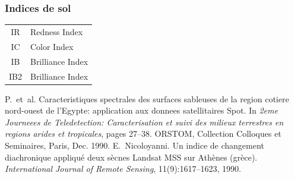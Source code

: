 \documentclass[compress]{beamer}
\begin{document}
\begin{frame}
\frametitle{Indices de sol}
\footnotesize \centering
\begin{tabular}{|c|l|}
\hline
IR  & Redness Index  \cite{Pouget1990-IRIC} \\
IC  & Color Index  \cite{Pouget1990-IRIC} \\
IB  & Brilliance Index  \cite{Nicoloyanni1990-IB} \\
IB2 & Brilliance Index  \cite{Nicoloyanni1990-IB} \\
\hline
\end{tabular}
\begin{thebibliography}{noidea}
\tiny
{}
P.~et~al.
 Caracteristiques spectrales des surfaces sableuses de la region
  cotiere nord-ouest de l'{E}gypte: application aux donnees satellitaires
  {S}pot.
 In {\em 2eme Journeees de Teledetection: Caracterisation et suivi des
  milieux terrestres en regions arides et tropicales}, pages 27--38. ORSTOM,
  Collection Colloques et Seminaires, Paris, Dec. 1990.
E.~Nicoloyanni.
 Un indice de changement diachronique appliqu\'e deux s\`ecnes
  {L}andsat {MSS} sur {A}th\`enes (gr\`ece).
 {\em International Journal of Remote Sensing}, 11(9):1617--1623,
  1990.
\end{thebibliography}
\end{frame}
\end{document}
